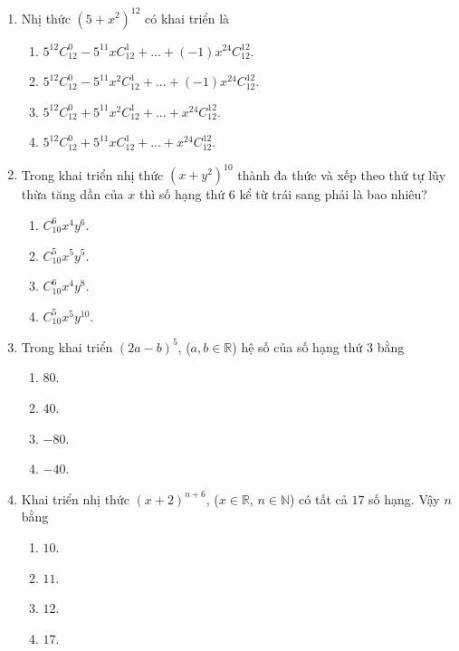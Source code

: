 \begin{enumerate}[label=\textbf{Câu \arabic*.},align=left,left=0cm..0cm,itemindent=*]
\begin{multicols}{4}
\begin{enumerate}[label=\textbf{\Alph*.},align=left,left=1cm..0cm,itemindent=*]
	\end{enumerate}\end{multicols}
	\item Nhị thức $(5+x^2)^{12}$ có khai triển là
	\begin{enumerate}[label=\textbf{\Alph*.},align=left,left=1cm..0cm,itemindent=*]
		\item $5^{12}C_{12}^0-5^{11}xC_{12}^1+...+(-1)x^{24}C_{12}^{12}$.
		\item $5^{12}C_{12}^0-5^{11}x^2C_{12}^1+...+ \left(-1\right) x^{24}C_{12}^{12}$.
		\item $5^{12}C_{12}^0+5^{11}x^2C_{12}^1+...+x^{24}C_{12}^{12}$.
		\item $5^{12}C_{12}^0+5^{11}xC_{12}^1+...+x^{24}C_{12}^{12}$.
	\end{enumerate}
	\item Trong khai triển nhị thức $\left(x+y^2\right)^{10}$ thành đa thức và xếp theo thứ tự lũy thừa tăng dần của $x$ thì số hạng thứ 6 kể từ trái sang phải là bao nhiêu?
	\begin{multicols}{4}\begin{enumerate}[label=\textbf{\Alph*.},align=left,left=1cm..0cm,itemindent=*]
		\item $C_{10}^6x^4y^6$. \item $C_{10}^5x^5y^5$. \item $C_{10}^6x^4y^8$. \item $C_{10}^5x^5y^{10}$.
	\end{enumerate}\end{multicols}
	\item Trong khai triển $(2a-b)^5$, ($a,b\in\mathbb{R}$) hệ số của số hạng thứ 3 bằng
	\begin{multicols}{4}\begin{enumerate}[label=\textbf{\Alph*.},align=left,left=1cm..0cm,itemindent=*]
		\item $80$. \item $40$. \item $-80$. \item $-40$.
	\end{enumerate}\end{multicols}
	\item Khai triển nhị thức $(x+2)^{n+6}$, ($x\in\mathbb{R}$, $n\in\mathbb{N}$) có tất cả $17$ số hạng. Vậy $n$ bằng
	\begin{multicols}{4}\begin{enumerate}[label=\textbf{\Alph*.},align=left,left=1cm..0cm,itemindent=*]
		\item $10$. \item $11$. \item $12$. \item $17$.

\end{enumerate}
\end{multicols}
\end{enumerate}
